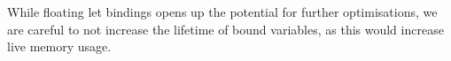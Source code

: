 While floating let bindings opens up the potential for further optimisations, we are careful to not increase the lifetime of bound variables, as this would increase live memory usage.








